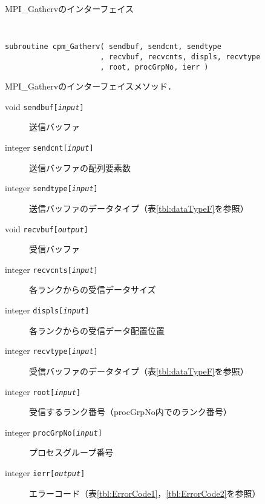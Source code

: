 \begin{spacing}{0.8}
\begin{itembox}[l]{MPI\_Gathervのインターフェイス}
{\tt
\begin{verbatim}
subroutine cpm_Gatherv( sendbuf, sendcnt, sendtype
                      , recvbuf, recvcnts, displs, recvtype
                      , root, procGrpNo, ierr )
\end{verbatim}
}
MPI\_Gathervのインターフェイスメソッド．
\begin{description}
\item[void    {\tt sendbuf[{\it input}]}] 送信バッファ
\item[integer {\tt sendcnt[{\it input}]}] 送信バッファの配列要素数
\item[integer {\tt sendtype[{\it input}]}] 送信バッファのデータタイプ（表\ref{tbl:dataTypeF}を参照）
\item[void    {\tt recvbuf[{\it output}]}] 受信バッファ
\item[integer {\tt recvcnts[{\it input}]}] 各ランクからの受信データサイズ
\item[integer {\tt displs[{\it input}]}] 各ランクからの受信データ配置位置
\item[integer {\tt recvtype[{\it input}]}] 受信バッファのデータタイプ（表\ref{tbl:dataTypeF}を参照）
\item[integer {\tt root[{\it input}]}] 受信するランク番号（procGrpNo内でのランク番号）
\item[integer {\tt procGrpNo[{\it input}]}] プロセスグループ番号
\item[integer {\tt ierr[{\it output}]}] エラーコード（表\ref{tbl:ErrorCode1}，\ref{tbl:ErrorCode2}を参照）
\end{description}
\end{itembox}\\
\end{spacing}

